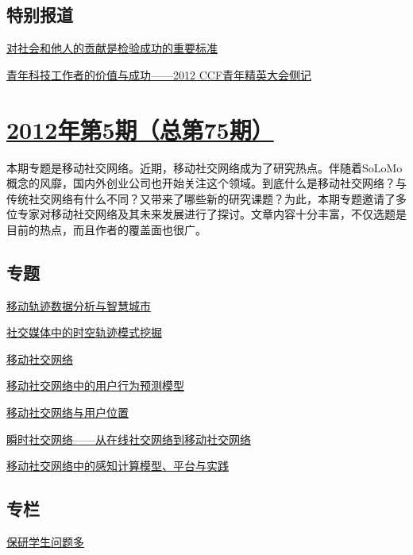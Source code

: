 \documentclass[a4paper]{article}
\begin{document}
\subsection{特别报道}
\href{http://history.ccf.org.cn/resources/1190201776262/2012/06/18/19.pdf}{对社会和他人的贡献是检验成功的重要标准}

\href{http://history.ccf.org.cn/resources/1190201776262/2012/06/18/18.pdf}{青年科技工作者的价值与成功——2012 CCF青年精英大会侧记}


\section{\href{http://history.ccf.org.cn/sites/ccf/jsjtbbd.jsp?contentId=2674572570143}{\textbf{2012年第5期（总第75期）}}}
本期专题是移动社交网络。近期，移动社交网络成为了研究热点。伴随着SoLoMo概念的风靡，国内外创业公司也开始关注这个领域。到底什么是移动社交网络？与传统社交网络有什么不同？又带来了哪些新的研究课题？为此，本期专题邀请了多位专家对移动社交网络及其未来发展进行了探讨。文章内容十分丰富，不仅选题是目前的热点，而且作者的覆盖面也很广。
\subsection{专题}
\href{http://history.ccf.org.cn/resources/1190201776262/2012/05/18/6.pdf}{移动轨迹数据分析与智慧城市}

\href{http://history.ccf.org.cn/resources/1190201776262/2012/05/18/7.pdf}{社交媒体中的时空轨迹模式挖掘}

\href{http://history.ccf.org.cn/resources/1190201776262/2012/05/18/1.pdf}{移动社交网络}

\href{http://history.ccf.org.cn/resources/1190201776262/2012/05/18/4.pdf}{移动社交网络中的用户行为预测模型}

\href{http://history.ccf.org.cn/resources/1190201776262/2012/05/18/5.pdf}{移动社交网络与用户位置}

\href{http://history.ccf.org.cn/resources/1190201776262/2012/05/18/2.pdf}{瞬时社交网络——从在线社交网络到移动社交网络}

\href{http://history.ccf.org.cn/resources/1190201776262/2012/05/18/3.pdf}{移动社交网络中的感知计算模型、平台与实践}

\subsection{专栏}
\href{http://history.ccf.org.cn/resources/1190201776262/2012/05/18/8.pdf}{保研学生问题多}
\end{document}
